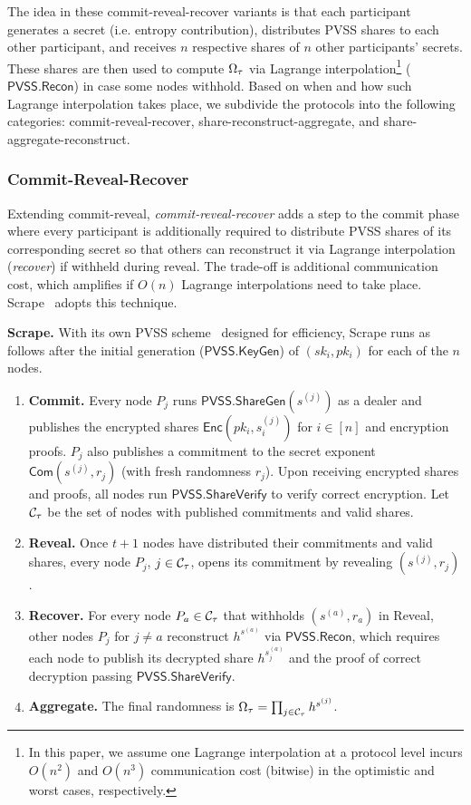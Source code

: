 The idea in these commit-reveal-recover variants is that each participant generates a secret (i.e. entropy contribution), distributes PVSS shares to each other participant, and receives $n$ respective shares of $n$ other participants' secrets. These shares are then used to compute $\Omega_\tau$ via Lagrange interpolation\footnote{In this paper, we assume one Lagrange interpolation at a protocol level incurs $O(n^2)$ and $O(n^3)$ communication cost (bitwise) in the optimistic and worst cases, respectively.} ($\mathsf{PVSS.Recon}$) in case some nodes withhold. Based on when and how such Lagrange interpolation takes place, we subdivide the protocols into the following categories: commit-reveal-recover, share-reconstruct-aggregate, and share-aggregate-reconstruct.

\subsubsection{Commit-Reveal-Recover}
Extending commit-reveal, \textit{commit-reveal-recover} adds a step to the commit phase where every participant is additionally required to distribute PVSS shares of its corresponding secret so that others can reconstruct it via Lagrange interpolation (\textit{recover}) if withheld during reveal. The trade-off is additional communication cost, which amplifies if $O(n)$ Lagrange interpolations need to take place. Scrape~\cite{cascudo2017scrape} adopts this technique.

\noindent\textbf{Scrape.} With its own PVSS scheme~\cite{cascudo2017scrape} designed for efficiency, Scrape runs as follows after the initial generation ($\mathsf{PVSS.KeyGen}$) of $(sk_i, pk_i)$ for each of the $n$ nodes.
\begin{enumerate}
\item \textbf{Commit.} Every node $P_j$ runs $\mathsf{PVSS.ShareGen}(s^{(j)})$ as a dealer and publishes the encrypted shares $\mathsf{Enc}(pk_i, s^{(j)}_i)$ for $i \in [n]$ and encryption proofs. $P_j$ also publishes a commitment to the secret exponent $\mathsf{Com}(s^{(j)}, r_j)$ (with fresh randomness $r_j$). Upon receiving encrypted shares and proofs, all nodes run $\mathsf{PVSS.ShareVerify}$ to verify correct encryption. Let $\mathcal{C}_\tau$ be the set of nodes with published commitments and valid shares.
\item \textbf{Reveal.} Once $t + 1$ nodes have distributed their commitments and valid shares, every node $P_j$, $j \in \mathcal{C}_\tau$, opens its commitment by revealing $(s^{(j)}, r_j)$.
\item \textbf{Recover.} For every node $P_a \in \mathcal{C}_\tau$ that withholds $(s^{(a)}, r_a)$ in Reveal, other nodes $P_j$ for $j \neq a$ reconstruct $h^{s^{(a)}}$ via $\mathsf{PVSS.Recon}$, which requires each node to publish its decrypted share $h^{s_j^{(a)}}$ and the proof of correct decryption passing $\mathsf{PVSS.ShareVerify}$.
\item \textbf{Aggregate.} The final randomness is $\Omega_\tau = \prod_{j \in \mathcal{C}_\tau} h^{s^{(j)}}$.
\end{enumerate}

